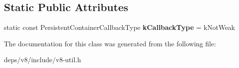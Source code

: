 \subsection*{Static Public Attributes}
\begin{DoxyCompactItemize}
\item 
\hypertarget{classv8_1_1_default_global_map_traits_aca4a466a95927f10ea3fa0bff1e041d2}{}static const Persistent\+Container\+Callback\+Type {\bfseries k\+Callback\+Type} = k\+Not\+Weak\label{classv8_1_1_default_global_map_traits_aca4a466a95927f10ea3fa0bff1e041d2}

\end{DoxyCompactItemize}


The documentation for this class was generated from the following file\+:\begin{DoxyCompactItemize}
\item 
deps/v8/include/v8-\/util.\+h\end{DoxyCompactItemize}
